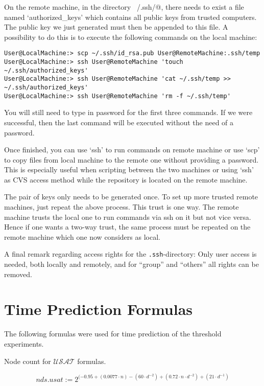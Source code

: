 \documentclass{book}
\begin{document}
On the remote machine, in the directory \verb@~/.ssh/@, there needs to exist a file named `authorized\_keys' which contains all  
public keys from trusted computers. The public key we just generated must then be appended to this file. A possibility to do this is to execute the following commands on the local machine:

\begin{verbatim}
User@LocalMachine:> scp ~/.ssh/id_rsa.pub User@RemoteMachine:.ssh/temp
User@LocalMachine:> ssh User@RemoteMachine 'touch ~/.ssh/authorized_keys'
User@LocalMachine:> ssh User@RemoteMachine 'cat ~/.ssh/temp >> ~/.ssh/authorized_keys'
User@LocalMachine:> ssh User@RemoteMachine 'rm -f ~/.ssh/temp'
\end{verbatim}

You will still need to type in password for the first three commands. If we were successful, then the last command will be executed without the need of a password.

Once finished, you can use `ssh' to run commands on remote machine or use `scp' to copy files from local machine to the remote one without providing a password. This is especially useful when scripting between the two machines or using `ssh' as CVS access method while the repository is located on the remote machine.

The pair of keys only needs to be generated once. To set up more trusted remote machines, just repeat the above process. This trust is one way. The remote machine trusts the local one to run commands via ssh on it but not vice versa. Hence if one wants a two-way trust, the same process must be repeated on the remote machine which one now considers as local.       

A final remark regarding access rights for the \texttt{.ssh}-directory: Only user access is needed, both locally and remotely, and for ``group'' and ``others'' all rights can be removed.




\section{Time Prediction Formulas}
\label{sec:finalreportprediction}

The following formulas were used for time prediction of the threshold experiments.

Node count for $\mathcal{USAT}$ formulas.

\begin{displaymath}
nds.usat := 2^{(-0.95 + (0.0077 \cdot n) - (60 \cdot d^{-2}) + (0.72 \cdot n \cdot d^{-2}) + (21 \cdot d^{-1})}
\end{displaymath}
\end{document}
